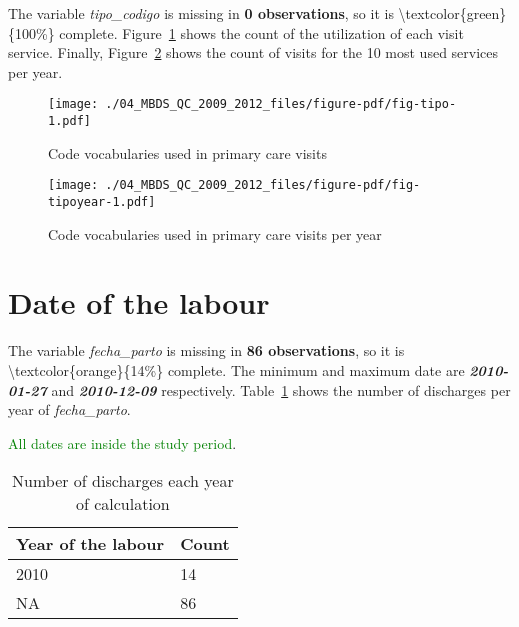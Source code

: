 \documentclass[
  letterpaper,
  DIV=11,
  numbers=noendperiod]{scrreprt}
\begin{document}
The variable \emph{tipo\_codigo} is missing in \textbf{0 observations},
so it is \textbackslash textcolor\{green\}\{100\%\} complete.
Figure~\ref{fig-tipo} shows the count of the utilization of each visit
service. Finally, Figure~\ref{fig-tipoyear} shows the count of visits
for the 10 most used services per year.

\begin{figure}

{\centering \texttt{[image: ./04\_MBDS\_QC\_2009\_2012\_files/figure-pdf/fig-tipo-1.pdf]}

}

\caption{\label{fig-tipo}Code vocabularies used in primary care visits}

\end{figure}

\begin{figure}

{\centering \texttt{[image: ./04\_MBDS\_QC\_2009\_2012\_files/figure-pdf/fig-tipoyear-1.pdf]}

}

\caption{\label{fig-tipoyear}Code vocabularies used in primary care
visits per year}

\end{figure}

\hypertarget{date-of-the-labour}{%
\section{Date of the labour}\label{date-of-the-labour}}

The variable \emph{fecha\_parto} is missing in \textbf{86 observations},
so it is \textbackslash textcolor\{orange\}\{14\%\} complete. The
minimum and maximum date are \textbf{\emph{2010-01-27}} and
\textbf{\emph{2010-12-09}} respectively. Table~\ref{tbl-fechaparto}
shows the number of discharges per year of \emph{fecha\_parto}.

\textcolor{green}{All dates are inside the study period}.

\hypertarget{tbl-fechaparto}{}
\begin{longtable}{ll}
\caption{\label{tbl-fechaparto}Number of discharges each year of calculation }\tabularnewline

\toprule
Year of the labour & Count \\ 
\midrule
2010 & 14 \\ 
NA & 86 \\ 
\bottomrule
\end{longtable}
\end{document}
